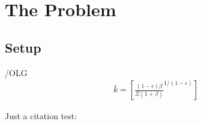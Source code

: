 \documentclass[BufferStockTheory]{subfiles}
\begin{document}
{\titlepagefinish}

\hypertarget{Introduction}{}




\hypertarget{The-Problem}{}

\section{The Problem}

\subsection{Setup}\label{subsec:Setup}


\begin{verbatimwrite}{\EqDir/OLG}
  \begin{align}%
    \bar{k} = \left[\frac{(1-\epsilon)\beta}{\Xi (1+\beta)}^{1/(1-\epsilon)} \right]
  \end{align}
\end{verbatimwrite}




\hypertarget{PF-Constrained-Solution}{}
\hypertarget{Constrained-Solution}{}







Just a citation test: \cite{DostenTest}
\cite{friedmanATheory}




\end{document}
